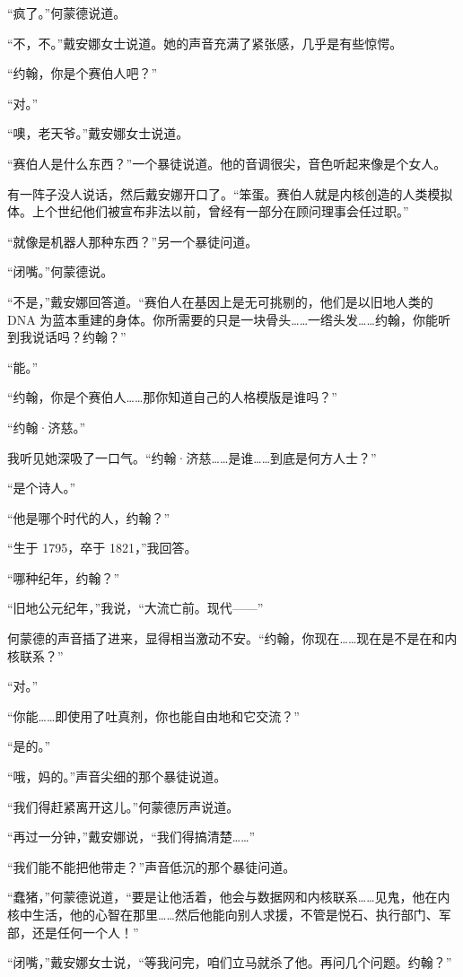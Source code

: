 \documentclass[AutoFakeBold=true]{book}
\begin{document}
``疯了。''何蒙德说道。

``不，不。''戴安娜女士说道。她的声音充满了紧张感，几乎是有些惊愕。

``约翰，你是个赛伯人吧？''

``对。''

``噢，老天爷。''戴安娜女士说道。

``赛伯人是什么东西？''一个暴徒说道。他的音调很尖，音色听起来像是个女人。

有一阵子没人说话，然后戴安娜开口了。``笨蛋。赛伯人就是内核创造的人类模拟体。上个世纪他们被宣布非法以前，曾经有一部分在顾问理事会任过职。''

``就像是机器人那种东西？''另一个暴徒问道。

``闭嘴。''何蒙德说。

``不是，''戴安娜回答道。``赛伯人在基因上是无可挑剔的，他们是以旧地人类的 DNA 为蓝本重建的身体。你所需要的只是一块骨头……一绺头发……约翰，你能听到我说话吗？约翰？''

``能。''

``约翰，你是个赛伯人……那你知道自己的人格模版是谁吗？''

``约翰·济慈。''

我听见她深吸了一口气。``约翰·济慈……是谁……到底是何方人士？''

``是个诗人。''

``他是哪个时代的人，约翰？''

``生于 1795，卒于 1821，''我回答。

``哪种纪年，约翰？''

``旧地公元纪年，''我说，``大流亡前。现代——''

何蒙德的声音插了进来，显得相当激动不安。``约翰，你现在……现在是不是在和内核联系？''

``对。''

``你能……即使用了吐真剂，你也能自由地和它交流？''

``是的。''

``哦，妈的。''声音尖细的那个暴徒说道。

``我们得赶紧离开这儿。''何蒙德厉声说道。

``再过一分钟，''戴安娜说，``我们得搞清楚……''

``我们能不能把他带走？''声音低沉的那个暴徒问道。

``蠢猪，''何蒙德说道，``要是让他活着，他会与数据网和内核联系……见鬼，他在内核中{\kaishu 生活}，他的心智在那里……然后他能向别人求援，不管是悦石、执行部门、军部，还是{\kaishu 任何一个人}！''

``闭嘴，''戴安娜女士说，``等我问完，咱们立马就杀了他。再问几个问题。约翰？''
\end{document}
